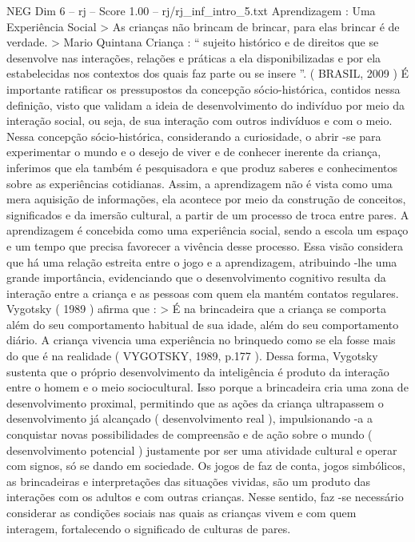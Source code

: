\begin{textsample}{NEG Dim 6 – rj – Score 1.00 – rj/rj\_inf\_intro\_5.txt}  \label{ex:f6_neg_005}
Aprendizagem : Uma Experiência Social > As crianças não brincam de brincar, para elas brincar é de verdade. > Mario Quintana Criança : “ sujeito histórico e de direitos que se desenvolve nas interações, relações e práticas a ela disponibilizadas e por ela estabelecidas nos contextos dos quais faz parte ou se insere ”. ( BRASIL, 2009 ) É importante ratificar os pressupostos da concepção sócio-histórica, contidos nessa definição, visto que validam a ideia de desenvolvimento do indivíduo por meio da interação social, ou seja, de sua interação com outros indivíduos e com o meio.
Nessa concepção sócio-histórica, considerando a curiosidade, o abrir -se para experimentar o mundo e o desejo de viver e de conhecer inerente da criança, inferimos que ela também é pesquisadora e que produz saberes e conhecimentos sobre as experiências cotidianas.
Assim, a aprendizagem não é vista como uma mera aquisição de informações, ela acontece por meio da construção de conceitos, significados e da imersão cultural, a partir de um processo de troca entre pares.
A aprendizagem é concebida como uma experiência social, sendo a escola um espaço e um tempo que precisa favorecer a vivência desse processo.
Essa visão considera que há uma relação estreita entre o jogo e a aprendizagem, atribuindo -lhe uma grande importância, evidenciando que o desenvolvimento cognitivo resulta da interação entre a criança e as pessoas com quem ela mantém contatos regulares.
Vygotsky ( 1989 ) afirma que : > É na brincadeira que a criança se comporta além do seu comportamento habitual de sua idade, além do seu comportamento diário.
A criança vivencia uma experiência no brinquedo como se ela fosse mais do que é na realidade ( VYGOTSKY, 1989, p.177 ).
Dessa forma, Vygotsky sustenta que o próprio desenvolvimento da inteligência é produto da interação entre o homem e o meio sociocultural.
Isso porque a brincadeira cria uma zona de desenvolvimento proximal, permitindo que as ações da criança ultrapassem o desenvolvimento já alcançado ( desenvolvimento real ), impulsionando -a a conquistar novas possibilidades de compreensão e de ação sobre o mundo ( desenvolvimento potencial ) justamente por ser uma atividade cultural e operar com signos, só se dando em sociedade.
Os jogos de faz de conta, jogos simbólicos, as brincadeiras e interpretações das situações vividas, são um produto das interações com os adultos e com outras crianças.
Nesse sentido, faz -se necessário considerar as condições sociais nas quais as crianças vivem e com quem interagem, fortalecendo o significado de culturas de pares.

\end{textsample}
